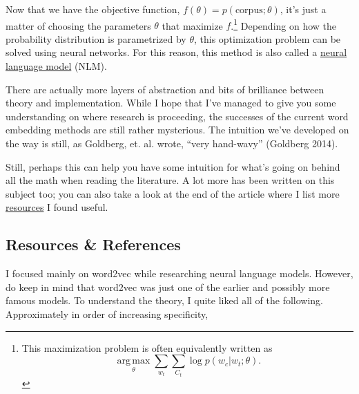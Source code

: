 \documentclass[11pt]{article}
\begin{document}
Now that we have the objective function,
\(f(\theta) = p(\textrm{corpus};\theta)\), it's just a matter of
choosing the parameters \(\theta\) that maximize \(f\).\footnote{This
  maximization problem is often equivalently written as
  \[\operatorname*{arg\,max}_\theta \sum_{w_t} \sum_{C_t} \log p(w_c|w_t;\theta).\]}
Depending on how the probability distribution is parametrized by
\(\theta\), this optimization problem can be solved using neural
networks. For this reason, this method is also called a
\href{https://en.wikipedia.org/wiki/Language_model\#Neural_language_models}{neural
language model} (NLM).

There are actually more layers of abstraction and bits of brilliance
between theory and implementation. While I hope that I've managed to
give you some understanding on where research is proceeding, the
successes of the current word embedding methods are still rather
mysterious. The intuition we've developed on the way is still, as
Goldberg, et. al. wrote, ``very hand-wavy'' (Goldberg 2014).

Still, perhaps this can help you have some intuition for what's going on
behind all the math when reading the literature. A lot more has been
written on this subject too; you can also take a look at the end of the
article where I list more
\protect\hyperlink{resources-ux5cux26-references}{resources} I found
useful.


\subsection*{Resources \& References}\label{resources-references}

I focused mainly on word2vec while researching neural language models.
However, do keep in mind that word2vec was just one of the earlier and
possibly more famous models. To understand the theory, I quite liked all
of the following. Approximately in order of increasing specificity,
\end{document}
